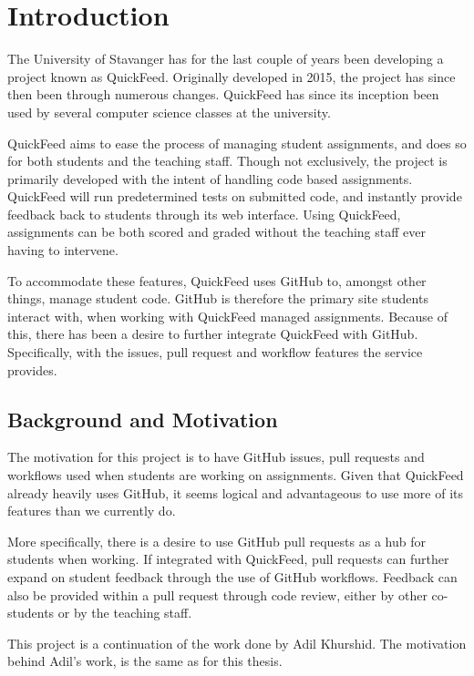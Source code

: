 
\chapter{Introduction}
\label{ch:intro}

The University of Stavanger has for the last couple of years been developing a project known as QuickFeed.
Originally developed in 2015, the project has since then been through numerous changes. %
QuickFeed has since its inception been used by several computer science classes at the university.

QuickFeed aims to ease the process of managing student assignments, and does so for both students and the teaching staff.
Though not exclusively, the project is primarily developed with the intent of handling code based assignments.
QuickFeed will run predetermined tests on submitted code, and instantly provide feedback back to students through its web interface.
Using QuickFeed, assignments can be both scored and graded without the teaching staff ever having to intervene.

To accommodate these features, QuickFeed uses GitHub to, amongst other things, manage student code.
GitHub is therefore the primary site students interact with, when working with QuickFeed managed assignments.
Because of this, there has been a desire to further integrate QuickFeed with GitHub.
Specifically, with the issues, pull request and workflow features the service provides.

\section{Background and Motivation}
\label{sec:motivation}

The motivation for this project is to have GitHub issues, pull requests and workflows used when students are working on assignments.
Given that QuickFeed already heavily uses GitHub, it seems logical and advantageous to use more of its features than we currently do.

More specifically, there is a desire to use GitHub pull requests as a hub for students when working.
If integrated with QuickFeed, pull requests can further expand on student feedback through the use of GitHub workflows.
Feedback can also be provided within a pull request through code review, either by other co-students or by the teaching staff.

This project is a continuation of the work done by Adil Khurshid. %
The motivation behind Adil's work, is the same as for this thesis.

